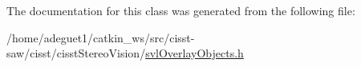 The documentation for this class was generated from the following file\-:\begin{DoxyCompactItemize}
\item 
/home/adeguet1/catkin\-\_\-ws/src/cisst-\/saw/cisst/cisst\-Stereo\-Vision/\hyperlink{svl_overlay_objects_8h}{svl\-Overlay\-Objects.\-h}\end{DoxyCompactItemize}
